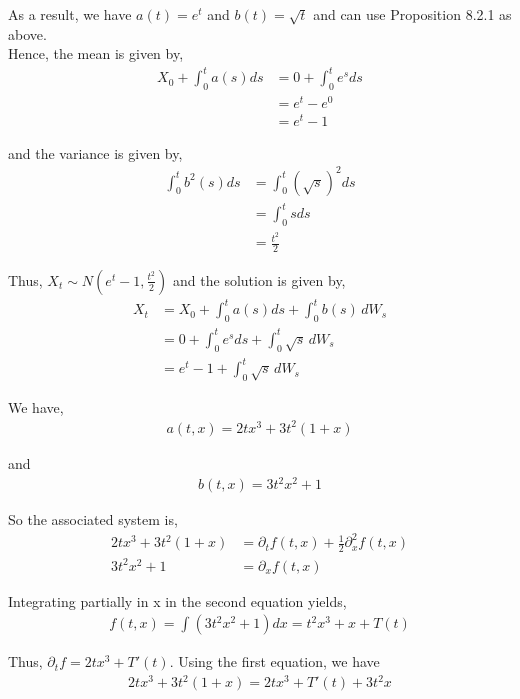 \documentclass[12pt]{article}
\newenvironment{problem}[2][Problem]{\begin{trivlist}
\item[\hskip \labelsep {\bfseries #1}\hskip \labelsep {\bfseries #2.}]}{\end{trivlist}}
\begin{document}
\begin{enumerate}[\alph*)]
As a result, we have $a(t) = e^{t}$ and $b(t) = \sqrt{t}$ and can use Proposition 8.2.1 as above.\\

Hence, the mean is given by,
\begin{align*}
X_0 + \int_0^t a(s) ds &= 0 + \int_0^t e^s ds\\
&= e^t - e^0\\
&= e^t - 1
\end{align*}

and the variance is given by,
\begin{align*}
\int_0^t b^2(s) ds &= \int_0^t \left(\sqrt{s}\right)^2 ds\\
&= \int_0^t s ds\\
&= \frac{t^2}{2}
\end{align*}

Thus, $X_t \sim N\left(e^t - 1, \frac{t^2}{2}\right)$ and the solution is given by,
\begin{align*}
X_t &= X_0 + \int_0^t a(s) ds + \int_0^t b(s) \, dW_s\\
&= 0 + \int_0^t e^s ds + \int_0^t \sqrt{s} \, dW_s\\
&= e^t - 1 + \int_0^t \sqrt{s} \, dW_s
\end{align*}
\end{enumerate}

\begin{problem}{26}
\end{problem}

We have,
\begin{align*}
a(t,x) = 2tx^3 + 3t^2(1+x)
\end{align*}

and
\begin{align*}
b(t,x) = 3t^2x^2 + 1
\end{align*}

So the associated system is,
\begin{align*}
2tx^3 + 3t^2(1+x) &= \partial_t f(t,x) + \frac{1}{2} \partial_x^2 f(t,x)\\
3t^2x^2 + 1 &= \partial_x f(t,x)
\end{align*}

Integrating partially in x in the second equation yields,
\begin{align*}
f(t,x) = \int (3t^2x^2 + 1) dx = t^2x^3 + x + T(t)
\end{align*}

Thus, $\partial_t f = 2tx^3 + T'(t)$. Using the first equation, we have
\begin{align*}
2tx^3 + 3t^2(1+x) = 2tx^3 + T'(t) + 3t^2x
\end{align*}
\end{document}
